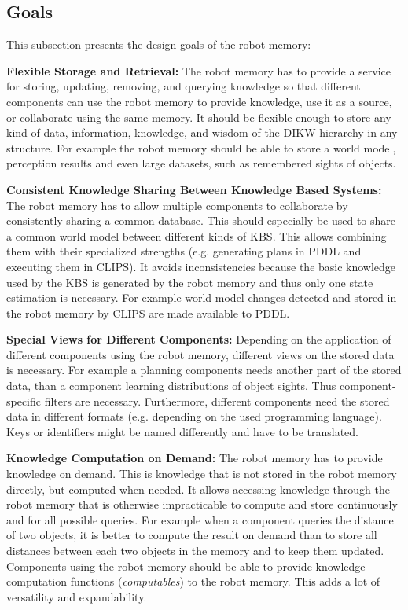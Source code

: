 \documentclass[a4paper,11pt]{article}
\begin{document}
\subsection{Goals}
\label{sec:goals}

This subsection presents the design goals of the robot memory:

\smallskip
\textbf{Flexible Storage and Retrieval:} The robot memory has to
provide a service for storing, updating, removing, and querying knowledge
so that different components can use the robot memory to provide knowledge,
use it as a source, or collaborate using the same memory. It should be
flexible enough to store any kind of data, information, knowledge, and
wisdom of the DIKW hierarchy in any structure. For example the robot
memory should be able to store a world model, perception results and
even large datasets, such as remembered sights of objects.

\smallskip
\textbf{Consistent Knowledge Sharing Between Knowledge Based Systems:}
The robot memory has to allow multiple components to collaborate by
consistently sharing a common database. This should especially be used
to share a common world model between different kinds of KBS. This
allows combining them with their specialized strengths
(e.g. generating plans in PDDL and executing them in CLIPS).  It
avoids inconsistencies because the basic knowledge used by the KBS is
generated by the robot memory and thus only one state estimation is
necessary. For example world model changes detected and stored in the
robot memory by CLIPS are made available to PDDL.

\smallskip
\textbf{Special Views for Different Components:} Depending on the
application of different components using the robot memory, different
views on the stored data is necessary. For example a planning
components needs another part of the stored data, than a component
learning distributions of object sights. Thus component-specific
filters are necessary. Furthermore, different components need the
stored data in different formats (e.g. depending on the used
programming language). Keys or identifiers might be named differently
and have to be translated.

\smallskip
\textbf{Knowledge Computation on Demand:} The robot memory has to
provide knowledge on demand. This is knowledge that is not stored in
the robot memory directly, but computed when needed. It allows
accessing knowledge through the robot memory that is otherwise
impracticable to compute and store continuously and for all possible
queries. For example when a component queries the distance of two
objects, it is better to compute the result on demand than to store
all distances between each two objects in the memory and to keep them
updated. Components using the robot memory should be able to provide
knowledge computation functions (\textit{computables}) to the robot
memory. This adds a lot of versatility and expandability.
\end{document}
